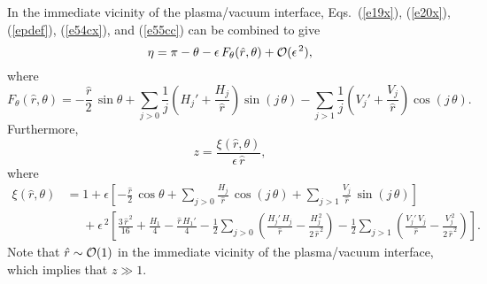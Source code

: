 \documentclass[12pt,prb,aps]{revtex4-1}
\begin{document}
In the immediate vicinity of the plasma/vacuum interface, Eqs.~(\ref{e19x}), (\ref{e20x}), (\ref{epdef}), (\ref{e54cx}), and (\ref{e55cc}) can
be combined to give\,\cite{fitz2024}
\begin{equation}\label{e73h}
\eta=\pi-\theta-\epsilon\,F_\theta(\hat{r},\theta)+{\cal O}(\epsilon^{\,2}),
\end{equation}
where
\begin{equation}\label{e234}
F_\theta(\hat{r},\theta) = -\frac{\hat{r}}{2}\,\sin\theta+\sum_{j>0}\frac{1}{j}\left(H_j' + \frac{H_j}{\hat{r}}\right)\sin(j\,\theta)
-\sum_{j>1}\frac{1}{j}\left(V_j' + \frac{V_j}{\hat{r}}\right)\cos(j\,\theta).
\end{equation}
Furthermore, 
\begin{equation}\label{e74cc}
z = \frac{\xi(\hat{r},\theta)}{\epsilon\,\hat{r}},
\end{equation}
where 
\begin{align}\label{e75cc}
\xi(\hat{r},\theta)&= 1+ \epsilon\left[-\frac{\hat{r}}{2}\,\cos\theta
 +\sum_{j>0}\frac{H_j}{\hat{r}}\,\cos(j\,\theta)+\sum_{j>1}\frac{V_j}{\hat{r}}\,\sin(j\,\theta)\right] \\[0.5ex]
 &\phantom{=}+ \epsilon^{\,2}\left[\frac{3\,\hat{r}^{\,2}}{16}+\frac{H_1}{4}-\frac{\hat{r}\,H_1'}{4}
-\frac{1}{2}\sum_{j>0}\left(\frac{H_j'\,H_j}{\hat{r}}-\frac{H_j^{\,2}}{2\,\hat{r}^{\,2}}\right)-\frac{1}{2}\sum_{j>1}\left(\frac{V_j'\,V_j}{\hat{r}}-\frac{V_j^{\,2}}{2\,\hat{r}^{\,2}}\right)\right].\nonumber
\end{align}
Note that  $\hat{r}\sim{\cal O}(1)$ in the immediate vicinity of the plasma/vacuum interface, which implies that $z\gg 1$. 
\end{document}
